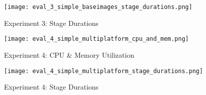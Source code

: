 \begin{figure}[H]
    \centering
    \texttt{[image: eval\_3\_simple\_baseimages\_stage\_durations.png]}
    \caption{Experiment 3: Stage Durations}
    \label{fig:eval_3_simplest_stage_durations}
\end{figure}

\begin{figure}[H]
    \begin{adjustwidth}{-0.2\paperwidth}{-0.2\paperwidth}
        \centering
        \texttt{[image: eval\_4\_simple\_multiplatform\_cpu\_and\_mem.png]}
        \caption{Experiment 4: CPU \& Memory Utilization}
        \label{fig:eval_4_cpu_and_mem}
    \end{adjustwidth}
\end{figure}

\begin{figure}[H]
    \centering
    \texttt{[image: eval\_4\_simple\_multiplatform\_stage\_durations.png]}
    \caption{Experiment 4: Stage Durations}
    \label{fig:eval_4_simplest_stage_durations}
\end{figure}
